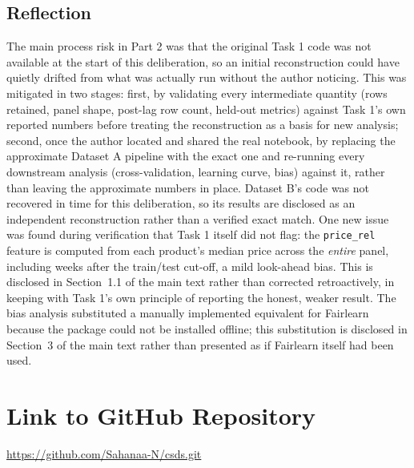\subsection{Reflection}

The main process risk in Part 2 was that the original Task 1 code was not available at the start
of this deliberation, so an initial reconstruction could have quietly drifted from what was
actually run without the author noticing. This was mitigated in two stages: first, by validating
every intermediate quantity (rows retained, panel shape, post-lag row count, held-out metrics)
against Task 1's own reported numbers before treating the reconstruction as a basis for new
analysis; second, once the author located and shared the real notebook, by replacing the
approximate Dataset A pipeline with the exact one and re-running every downstream analysis
(cross-validation, learning curve, bias) against it, rather than leaving the approximate numbers
in place. Dataset B's code was not recovered in time for this deliberation, so its results are
disclosed as an independent reconstruction rather than a verified exact match. One new issue was
found during verification that Task 1 itself did not flag: the \texttt{price\_rel} feature is
computed from each product's median price across the \emph{entire} panel, including weeks after
the train/test cut-off, a mild look-ahead bias. This is disclosed in Section~1.1 of the main text
rather than corrected retroactively, in keeping with Task 1's own principle of reporting the
honest, weaker result. The bias analysis substituted a manually implemented equivalent for
Fairlearn because the package could not be installed offline; this substitution is disclosed in
Section~3 of the main text rather than presented as if Fairlearn itself had been used.

\section{Link to GitHub Repository}

\url{https://github.com/Sahanaa-N/csds.git}
